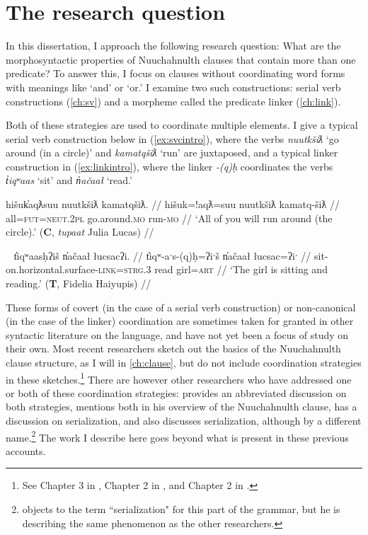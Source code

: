 \section{The research question} \label{ch:intro:researchquestion}

In this dissertation, I approach the following research question: What are the morphosyntactic properties of Nuuchahnulth clauses that contain more than one predicate? To answer this, I focus on clauses without coordinating word forms with meanings like `and' or `or.' I examine two such constructions: serial verb constructions (\cref{ch:sv}) and a morpheme called the predicate linker (\cref{ch:link}).

Both of these strategies are used to coordinate multiple elements. I give a typical serial verb construction below in (\ref{ex:svcintro}), where the verbs \textit{nuutkšiƛ} `go around (in a circle)' and \textit{kamatqšiƛ} `run' are juxtaposed, and a typical linker construction in (\ref{ex:linkintro}), where the linker \textit{-(q)ḥ} coordinates the verbs \textit{t̓iqʷaas} `sit' and \textit{n̓ačaał} `read.'

\ex \label{ex:svcintro}
\begingl
\glpreamble hišuk̓aqƛsuu nuutkšiƛ kamatqšiƛ. //
\gla hišuk=!aqƛ=suu nuutkšiƛ kamatq-šiƛ //
\glb all=\textsc{fut}=\textsc{neut.2pl} go.around.\textsc{mo} run-\textsc{mo} //
\glft `All of you will run around (the circle).' (\textbf{C}, \textit{tupaat} Julia Lucas) //
\endgl
\xe

\ex~ \label{ex:linkintro}
\begingl
\glpreamble t̓iqʷaasḥʔiš n̓ačaał łucsacʔi. //
\gla t̓iqʷ-aˑs-(q)ḥ=ʔiˑš n̓ačaał łucsac=ʔiˑ //
\glb sit-on.horizontal.surface-\textsc{link}=\textsc{strg.3} read girl=\textsc{art} //
\glft `The girl is sitting and reading.' (\textbf{T}, Fidelia Haiyupis) //
\endgl
\xe

These forms of covert (in the case of a serial verb construction) or non-canonical (in the case of the linker) coordination are sometimes taken for granted in other syntactic literature on the language, and have not yet been a focus of study on their own. Most recent researchers sketch out the basics of the Nuuchahnulth clause structure, as I will in \cref{ch:clause}, but do not include coordination strategies in these sketches.\footnote{See Chapter 3 in \citet{wojdak2005}, Chapter 2 in \citet{woo2007b}, and Chapter 2 in \citet{waldie2012}.} There are however other researchers who have addressed one or both of these coordination strategies: \citet{rose1981} provides an abbreviated discussion on both strategies, \citet{jacobsen1993} mentions both in his overview of the Nuuchahnulth clause, \citet{nakayama2001} has a discussion on serialization, and \citet{davidson2002} also discusses serialization, although by a different name.\footnote{\citeauthor{davidson2002} objects to the term ``serialization" for this part of the grammar, but he is describing the same phenomenon as the other researchers.} The work I describe here goes beyond what is present in these previous accounts.

